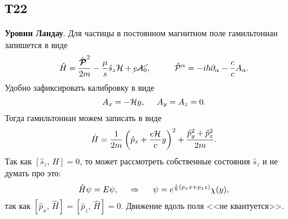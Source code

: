 \subsection*{Т22}

\textbf{Уровни Ландау}. 
Для частицы в постоянном магнитном поле гамильтониан запишется в виде
\begin{equation*}
	\hat{H} = \frac{\hat{\vc{\mathcal{P}}}^2}{2m}-
	\frac{\mu}{s} \hat{s}_z \H
	+\cancel{e A_0} ,
	\hspace{10 mm} 
	\hat{\mathcal{P}}^\alpha = -i  \hbar \partial_\alpha - \frac{e}{c} A_\alpha.
\end{equation*}
Удобно зафиксировать калибровку в виде
\begin{equation*}
	A_x = - \mathcal{H} y, \hspace{5 mm} A_y = A_z = 0. 
\end{equation*}
Тогда гамильтониан можем записать в виде
\begin{equation*}
	\hat{H} = \frac{1}{2m}\left(
		\hat{p}_x + \frac{e\mathcal{H}}{c}y
	\right)^2 + \frac{\hat{p}^2_y + \hat{p}^2_z}{2m}.
\end{equation*}
Так как $[\hat{s}_z,\, H] = 0$, то может рассмотреть собственные состояния $\hat{s}_z$ и не думать про это:
\begin{equation*}
	\hat{H} \psi = E \psi,
	\hspace{0.5cm} \Rightarrow \hspace{0.5cm}
	\psi = e^{\frac{i}{\hbar}\left(p_x x + p_z z\right)} \chi(y),
\end{equation*}
так как $[\hat{p}_x,\, \hat{H}] = [\hat{p}_z,\, \hat{H}] = 0$. Движение вдоль поля <<не квантуется>>.

